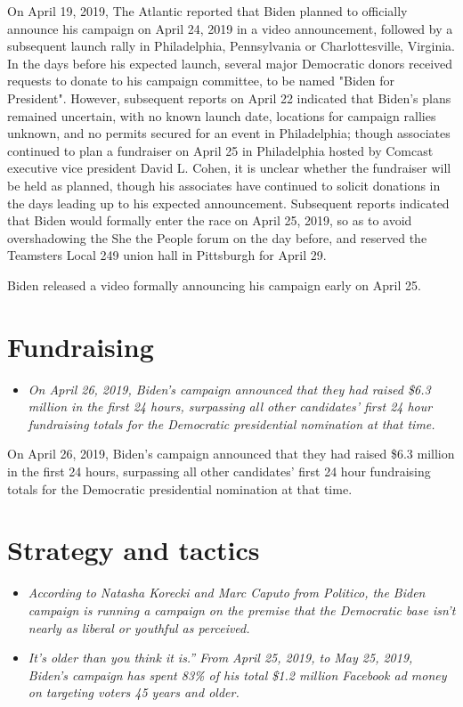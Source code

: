 On April 19, 2019, The Atlantic reported that Biden planned to
officially announce his campaign on April 24, 2019 in a video
announcement, followed by a subsequent launch rally in Philadelphia,
Pennsylvania or Charlottesville, Virginia. In the days before his
expected launch, several major Democratic donors received requests to
donate to his campaign committee, to be named "Biden for President".
However, subsequent reports on April 22 indicated that Biden's plans
remained uncertain, with no known launch date, locations for campaign
rallies unknown, and no permits secured for an event in Philadelphia;
though associates continued to plan a fundraiser on April 25 in
Philadelphia hosted by Comcast executive vice president David L. Cohen,
it is unclear whether the fundraiser will be held as planned, though his
associates have continued to solicit donations in the days leading up to
his expected announcement. Subsequent reports indicated that Biden would
formally enter the race on April 25, 2019, so as to avoid overshadowing
the She the People forum on the day before, and reserved the Teamsters
Local 249 union hall in Pittsburgh for April 29.

Biden released a video formally announcing his campaign early on April
25.

\section{Fundraising}\label{fundraising}

\begin{itemize}
\item
  \emph{On April 26, 2019, Biden's campaign announced that they had
  raised \$6.3 million in the first 24 hours, surpassing all other
  candidates' first 24 hour fundraising totals for the Democratic
  presidential nomination at that time.}
\end{itemize}

On April 26, 2019, Biden's campaign announced that they had raised \$6.3
million in the first 24 hours, surpassing all other candidates' first 24
hour fundraising totals for the Democratic presidential nomination at
that time.

\section{Strategy and tactics}\label{strategy-and-tactics}

\begin{itemize}
\item
  \emph{According to Natasha Korecki and Marc Caputo from Politico, the
  Biden campaign is running a campaign on the premise that the
  Democratic base isn't nearly as liberal or youthful as perceived.}
\item
  \emph{It's older than you think it is.'' From April 25, 2019, to May
  25, 2019, Biden's campaign has spent 83\% of his total \$1.2 million
  Facebook ad money on targeting voters 45 years and older.}
\end{itemize}

